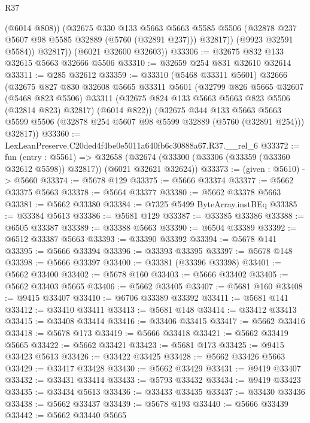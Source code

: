 \begin{lexlean}{R37}
\begin{coremodule}
                (@6014 @808))
              (@32675
                @330
                @133
                @5663
                @5663
                @5585
                @5506
                (@32878 @237 @5607 @98 @5585 @32889 (@5760 (@32891 @237)))
                @32817))
            (@9923 @32591 @5584))
          @32817))
      (@6021 @32600 @32603))
@33306 := @32675 @832 @133 @32615 @5663 @32666 @5506
@33310 := @32659 @254 @831 @32610 @32614
@33311 := @285 @32612
@33359 := @33310
    (@5468 @33311 @5601)
    @32666
    (@32675
      @827
      @830
      @32608
      @5665
      @33311
      @5601
      (@32799
        @826
        @5665
        @32607
        (@5468 @823 @5506)
        @33311
        (@32675 @824 @133 @5663 @5663 @823 @5506 (@32814 @823) @32817)
        (@6014 @822))
      (@32675
        @344
        @133
        @5663
        @5663
        @5599
        @5506
        (@32878 @254 @5607 @98 @5599 @32889 (@5760 (@32891 @254)))
        @32817))
@33360 := LexLeanPreserve.C20ded4f4be0e5011a640fb6c30888a67.R37.__rel_6
@33372 := fun (entry : @5561) =>
  @32658 (@32674 (@33300 (@33306 (@33359 (@33360 @32612 @5598)) @32817)) (@6021 @32621 @32624))
@33373 := (given : @5610) -> @5660
@33374 := @5678 @129
@33375 := @5666 @33374
@33377 := @5662 @33375 @5663
@33378 := @5664 @33377
@33380 := @5662 @33378 @5663
@33381 := @5662 @33380
@33384 := @7325 @5499 ByteArray.instBEq
@33385 := @33384 @5613
@33386 := @5681 @129
@33387 := @33385 @33386
@33388 := @6505 @33387
@33389 := @33388 @5663
@33390 := @6504 @33389
@33392 := @6512 @33387 @5663
@33393 := @33390 @33392
@33394 := @5678 @141
@33395 := @5666 @33394
@33396 := @33393 @33395
@33397 := @5678 @148
@33398 := @5666 @33397
@33400 := @33381 (@33396 @33398)
@33401 := @5662 @33400
@33402 := @5678 @160
@33403 := @5666 @33402
@33405 := @5662 @33403 @5665
@33406 := @5662 @33405
@33407 := @5681 @160
@33408 := @9415 @33407
@33410 := @6706 @33389 @33392
@33411 := @5681 @141
@33412 := @33410 @33411
@33413 := @5681 @148
@33414 := @33412 @33413
@33415 := @33408 @33414
@33416 := @33406 @33415
@33417 := @5662 @33416
@33418 := @5678 @173
@33419 := @5666 @33418
@33421 := @5662 @33419 @5665
@33422 := @5662 @33421
@33423 := @5681 @173
@33425 := @9415 @33423 @5613
@33426 := @33422 @33425
@33428 := @5662 @33426 @5663
@33429 := @33417 @33428
@33430 := @5662 @33429
@33431 := @9419 @33407
@33432 := @33431 @33414
@33433 := @5793 @33432
@33434 := @9419 @33423
@33435 := @33434 @5613
@33436 := @33433 @33435
@33437 := @33430 @33436
@33438 := @5662 @33437
@33439 := @5678 @193
@33440 := @5666 @33439
@33442 := @5662 @33440 @5665

\end{coremodule}
\end{lexlean}
